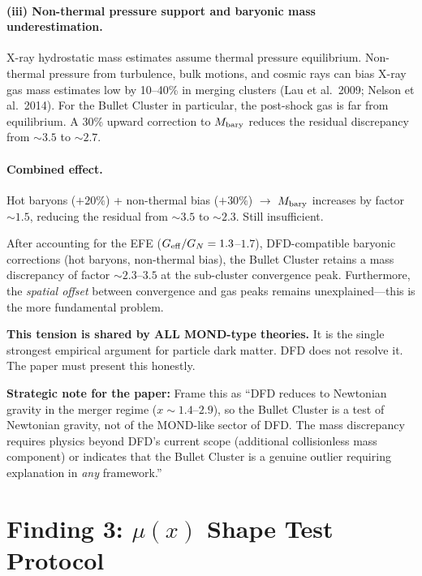 \documentclass[11pt,a4paper]{article}
\newcommand{\Geff}{G_{\rm eff}}
\begin{document}
\paragraph{(iii) Non-thermal pressure support and baryonic mass underestimation.}
X-ray hydrostatic mass estimates assume thermal pressure equilibrium.  Non-thermal
pressure from turbulence, bulk motions, and cosmic rays can bias X-ray gas mass
estimates low by 10--40\% in merging clusters (Lau et al.\ 2009; Nelson et al.\
2014).  For the Bullet Cluster in particular, the post-shock gas is far from
equilibrium.  A 30\% upward correction to $M_{\rm bary}$ reduces the residual
discrepancy from $\sim 3.5$ to $\sim 2.7$.

\paragraph{Combined effect.}
Hot baryons ($+20\%$) + non-thermal bias ($+30\%$) $\to$ $M_{\rm bary}$
increases by factor $\sim 1.5$, reducing the residual from $\sim 3.5$ to
$\sim 2.3$.  Still insufficient.

\begin{tcolorbox}[colback=red!5!white, colframe=red!70!black,
  title=\textbf{HONEST NEGATIVE: Bullet Cluster Residual Factor $\sim 2.3$--$3.5$}]
After accounting for the EFE ($\Geff/G_N = 1.3$--$1.7$), DFD-compatible
baryonic corrections (hot baryons, non-thermal bias), the Bullet Cluster
retains a mass discrepancy of factor $\sim 2.3$--$3.5$ at the sub-cluster
convergence peak.  Furthermore, the \emph{spatial offset} between convergence
and gas peaks remains unexplained---this is the more fundamental problem.

\textbf{This tension is shared by ALL MOND-type theories.}  It is the single
strongest empirical argument for particle dark matter.  DFD does not resolve
it.  The paper must present this honestly.

\textbf{Strategic note for the paper:} Frame this as ``DFD reduces to
Newtonian gravity in the merger regime ($x \sim 1.4$--$2.9$), so the
Bullet Cluster is a test of Newtonian gravity, not of the MOND-like sector
of DFD.  The mass discrepancy requires physics beyond DFD's current scope
(additional collisionless mass component) or indicates that the Bullet
Cluster is a genuine outlier requiring explanation in \emph{any} framework.''
\end{tcolorbox}


\section{Finding 3: $\mu(x)$ Shape Test Protocol}
\label{sec:mu-shape}
\end{document}
